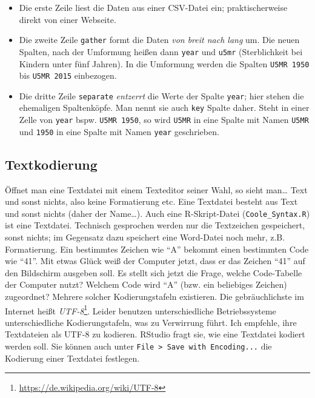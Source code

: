 \documentclass[12pt,ngerman,]{book}
\providecommand{\tightlist}{%
  \setlength{\itemsep}{0pt}\setlength{\parskip}{0pt}}
\let\rmarkdownfootnote\footnote%
\def\footnote{\protect\rmarkdownfootnote}
\begin{document}
\begin{itemize}
\tightlist
\item
  Die erste Zeile liest die Daten aus einer CSV-Datei ein;
  praktischerweise direkt von einer Webseite.\\
\item
  Die zweite Zeile \texttt{gather} formt die Daten \emph{von breit nach
  lang} um. Die neuen Spalten, nach der Umformung heißen dann
  \texttt{year} und \texttt{u5mr} (Sterblichkeit bei Kindern unter fünf
  Jahren). In die Umformung werden die Spalten \texttt{U5MR\ 1950} bis
  \texttt{U5MR\ 2015} einbezogen.
\item
  Die dritte Zeile \texttt{separate} \emph{entzerrt} die Werte der
  Spalte \texttt{year}; hier stehen die ehemaligen Spaltenköpfe. Man
  nennt sie auch \texttt{key} Spalte daher. Steht in einer Zelle von
  \texttt{year} bspw. \texttt{U5MR\ 1950}, so wird \texttt{U5MR} in eine
  Spalte mit Namen \texttt{U5MR} und \texttt{1950} in eine Spalte mit
  Namen \texttt{year} geschrieben.
\end{itemize}

\subsection{Textkodierung}\label{textkodierung}

Öffnet man eine Textdatei mit einem Texteditor seiner Wahl, so sieht
man\ldots{} Text und sonst nichts, also keine Formatierung etc. Eine
Textdatei besteht aus Text und sonst nichts (daher der Name\ldots{}).
Auch eine R-Skript-Datei (\texttt{Coole\_Syntax.R}) ist eine Textdatei.
Technisch gesprochen werden nur die Textzeichen gespeichert, sonst
nichts; im Gegensatz dazu speichert eine Word-Datei noch mehr, z.B.
Formatierung. Ein bestimmtes Zeichen wie ``A'' bekommt einen bestimmten
Code wie ``41''. Mit etwas Glück weiß der Computer jetzt, dass er das
Zeichen ``41'' auf den Bildschirm ausgeben soll. Es stellt sich jetzt
die Frage, welche Code-Tabelle der Computer nutzt? Welchem Code wird
``A'' (bzw. ein beliebiges Zeichen) zugeordnet? Mehrere solcher
Kodierungstafeln existieren. Die gebräuchlichste im Internet heißt
\emph{UTF-8}\footnote{\url{https://de.wikipedia.org/wiki/UTF-8}}. Leider
benutzen unterschiedliche Betriebssysteme unterschiedliche
Kodierungstafeln, was zu Verwirrung führt. Ich empfehle, ihre
Textdateien als UTF-8 zu kodieren. RStudio fragt sie, wie eine Textdatei
kodiert werden soll. Sie können auch unter
\texttt{File\ \textgreater{}\ Save\ with\ Encoding...} die Kodierung
einer Textdatei festlegen.
\end{document}
